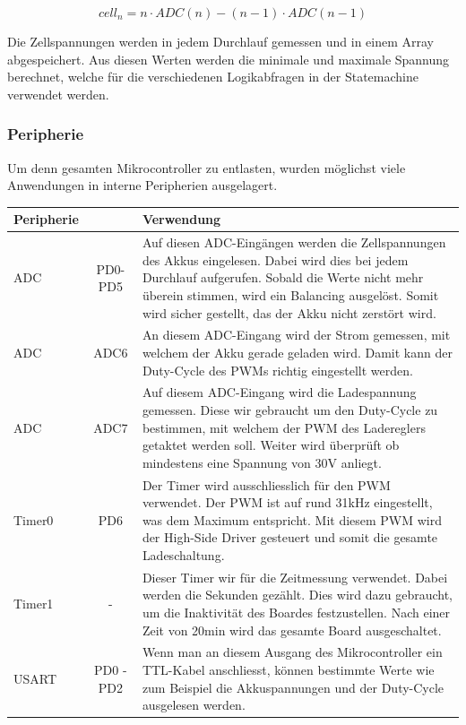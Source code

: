 \begin{equation}
	cell_n = n \cdot ADC(n) - (n-1)\cdot ADC(n-1)
	\label{eq:CellNSpannung}
\end{equation}

Die Zellspannungen werden in jedem Durchlauf gemessen und in einem Array abgespeichert. Aus diesen Werten werden die minimale und maximale Spannung berechnet, welche für die verschiedenen Logikabfragen in der Statemachine verwendet werden.

\subsubsection*{Peripherie}
Um denn gesamten Mikrocontroller zu entlasten, wurden möglichst viele Anwendungen in interne Peripherien ausgelagert. \\
\begin{tabularx}{\textwidth}{l|c|X}
	Peripherie & \rotatebox[origin=c]{90}{Port} & Verwendung \\ \hline
	ADC &
	PD0-PD5 &
	Auf diesen ADC-Eingängen werden die Zellspannungen des Akkus eingelesen. Dabei wird dies bei jedem Durchlauf aufgerufen. Sobald die Werte nicht mehr überein stimmen, wird ein Balancing ausgelöst. Somit wird sicher gestellt, das der Akku nicht zerstört wird.
	\\ \hline
	ADC &
	ADC6 &
	An diesem ADC-Eingang wird der Strom gemessen, mit welchem der Akku gerade geladen wird. Damit kann der Duty-Cycle des PWMs richtig eingestellt werden.
	\\ \hline
	ADC &
	ADC7 &
	Auf diesem ADC-Eingang wird die Ladespannung gemessen. Diese wir gebraucht um den Duty-Cycle zu bestimmen, mit welchem der PWM des Ladereglers getaktet werden soll. Weiter wird überprüft ob mindestens eine Spannung von 30V anliegt.
	\\ \hline
	Timer0 &
	PD6 &
	Der Timer wird ausschliesslich für den PWM verwendet. Der PWM ist auf rund 31kHz eingestellt, was dem Maximum entspricht. Mit diesem PWM wird der High-Side Driver gesteuert und somit die gesamte Ladeschaltung. 
	\\ \hline
	Timer1 &
	- &
	Dieser Timer wir für die Zeitmessung verwendet. Dabei werden die Sekunden gezählt. Dies wird dazu gebraucht, um die Inaktivität des Boardes festzustellen. Nach einer Zeit von 20min wird das gesamte Board ausgeschaltet. 
	\\ \hline
	USART &
	PD0 - PD2 &
	Wenn man an diesem Ausgang des Mikrocontroller ein TTL-Kabel anschliesst, können bestimmte Werte wie zum Beispiel die Akkuspannungen und der Duty-Cycle ausgelesen werden.
	\\ \hline
\end{tabularx}
\label{tab:peripherieBM}


